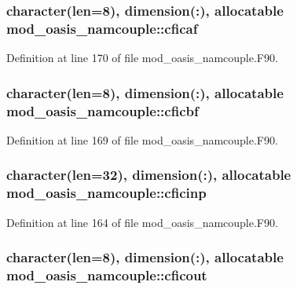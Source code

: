 \hypertarget{classmod__oasis__namcouple_a9b3c7c879a3ff2b5eb15cbcaf5a8a1d9}{
\subsubsection[{cficaf}]{\setlength{\rightskip}{0pt plus 5cm}character(len=8), dimension(\+:), allocatable mod\+\_\+oasis\+\_\+namcouple\+::cficaf\hspace{0.3cm}{\ttfamily [private]}}}\label{classmod__oasis__namcouple_a9b3c7c879a3ff2b5eb15cbcaf5a8a1d9}


Definition at line 170 of file mod\+\_\+oasis\+\_\+namcouple.\+F90.

\hypertarget{classmod__oasis__namcouple_a9e90e47fd11ff4dd95c61dcf3ec872ff}{
\subsubsection[{cficbf}]{\setlength{\rightskip}{0pt plus 5cm}character(len=8), dimension(\+:), allocatable mod\+\_\+oasis\+\_\+namcouple\+::cficbf\hspace{0.3cm}{\ttfamily [private]}}}\label{classmod__oasis__namcouple_a9e90e47fd11ff4dd95c61dcf3ec872ff}


Definition at line 169 of file mod\+\_\+oasis\+\_\+namcouple.\+F90.

\hypertarget{classmod__oasis__namcouple_af17e746f51dcf0110428ebe55f6d7285}{
\subsubsection[{cficinp}]{\setlength{\rightskip}{0pt plus 5cm}character(len=32), dimension(\+:), allocatable mod\+\_\+oasis\+\_\+namcouple\+::cficinp\hspace{0.3cm}{\ttfamily [private]}}}\label{classmod__oasis__namcouple_af17e746f51dcf0110428ebe55f6d7285}


Definition at line 164 of file mod\+\_\+oasis\+\_\+namcouple.\+F90.

\hypertarget{classmod__oasis__namcouple_a62f96a372f013fc37713f8ba1728e3de}{
\subsubsection[{cficout}]{\setlength{\rightskip}{0pt plus 5cm}character(len=8), dimension(\+:), allocatable mod\+\_\+oasis\+\_\+namcouple\+::cficout\hspace{0.3cm}{\ttfamily [private]}}}\label{classmod__oasis__namcouple_a62f96a372f013fc37713f8ba1728e3de}


